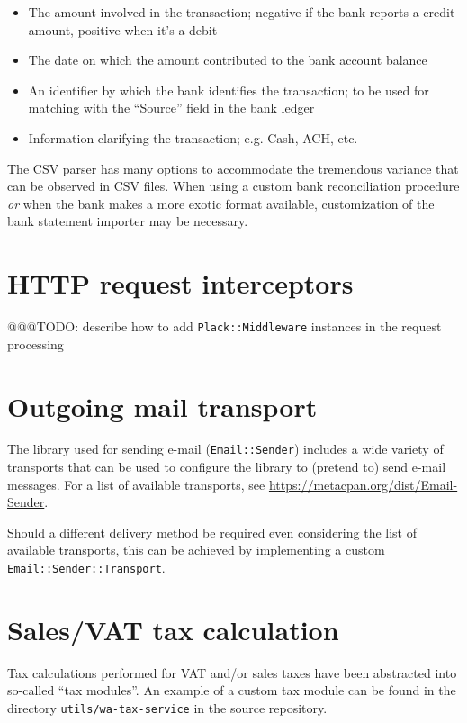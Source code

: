 \begin{itemize}
	\item [amount] The amount involved in the transaction; negative if the bank
		reports a credit amount, positive when it's a debit
	\item [date] The date on which the amount contributed to the bank account balance
	\item [source] An identifier by which the bank identifies the transaction; to be
		used for matching with the ``Source'' field in the bank ledger
	\item [type] Information clarifying the transaction; e.g. Cash, ACH, etc.
\end{itemize}

The CSV parser has many options to accommodate the tremendous variance that can be
observed in CSV files.  When using a custom bank reconciliation procedure \textit{or}
when the bank makes a more exotic format available, customization of the bank statement
importer may be necessary.

\section{HTTP request interceptors}
\label{sec-customization-http-requests}

@@@TODO: describe how to add \texttt{Plack::Middleware} instances in the request processing

\section{Outgoing mail transport}
\label{sec-customization-outgoing-mail}

The library used for sending e-mail (\texttt{Email::Sender})
includes a wide variety of transports that can be used to configure the library to (pretend to) send
e-mail messages.  For a list of available transports, see \url{https://metacpan.org/dist/Email-Sender}.

Should a different delivery method be required even considering the list of available transports,
this can be achieved by implementing a custom \texttt{Email::Sender::Transport}.

\section{Sales/VAT tax calculation}
\label{sec-customization-sales-tax}

Tax calculations performed for VAT and/or sales taxes have been abstracted into so-called
``tax modules''.  An example of a custom tax module can be found in the directory
\texttt{utils/wa-tax-service} in the source repository.

